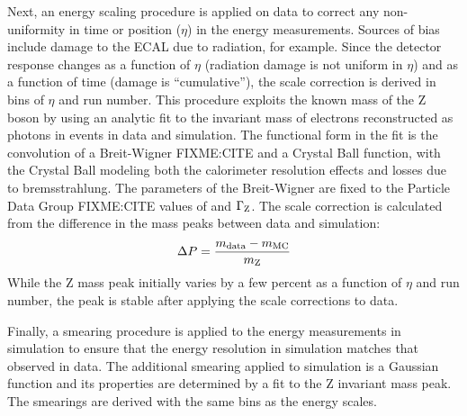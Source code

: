 Next, an energy scaling procedure is applied on data to correct any non-uniformity in time or position ($\eta$) in the energy measurements.
Sources of bias include damage to the ECAL due to radiation, for example.
Since the detector response changes as a function of $\eta$ (radiation damage is not uniform in $\eta$) and as a function of time (damage is ``cumulative''), the scale correction is derived in bins of $\eta$ and run number.
This procedure exploits the known mass of the Z boson by using an analytic fit to the invariant mass of electrons reconstructed as photons in \Zee events in data and simulation.
The functional form in the fit is the convolution of a Breit-Wigner FIXME:CITE and a Crystal Ball function, with the Crystal Ball modeling both the calorimeter resolution effects and losses due to bremsstrahlung.
The parameters of the Breit-Wigner are fixed to the Particle Data Group FIXME:CITE values of \mZ and $\Gamma_{\mathrm{Z}}$.
The scale correction is calculated from the difference in the mass peaks between data and simulation:
\begin{equation}
    \Delta P = \frac{m_{\text{data}} - m_{\text{MC}}}{m_{\mathrm{Z}}}
\end{equation}
While the Z mass peak initially varies by a few percent as a function of $\eta$ and run number, the peak is stable after applying the scale corrections to data. %

Finally, a smearing procedure is applied to the energy measurements in simulation to ensure that the energy resolution in simulation matches that observed in data.
The additional smearing applied to simulation is a Gaussian function and its properties are determined by a fit to the Z invariant mass peak.
The smearings are derived with the same bins as the energy scales.

